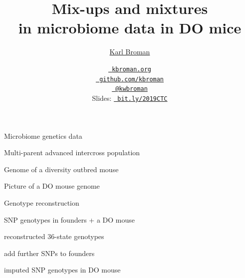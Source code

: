\documentclass[aspectratio=169,12pt,t]{beamer}
\title{Mix-ups and mixtures \\
  in microbiome data in DO mice}
\author{\href{https://kbroman.org}{Karl Broman}}
\institute{Biostatistics \& Medical Informatics \\ Univ.\ Wisconsin{\textendash}Madison}
\date{\href{https://kbroman.org}{\tt \scriptsize \color{foreground} kbroman.org}
\\[-4pt]
\href{https://github.com/kbroman}{\tt \scriptsize \color{foreground} github.com/kbroman}
\\[-4pt]
\href{https://twitter.com/kwbroman}{\tt \scriptsize \color{foreground} @kwbroman}
\\[2pt]
\scriptsize {\lolit Slides:} \href{https://bit.ly/2019CTC}{\tt \scriptsize
  \color{foreground} bit.ly/2019CTC}
}
\begin{document}
{
 }




\begin{frame}[c]{Microbiome genetics data}


\note{}

\end{frame}





\begin{frame}[c]{Multi-parent advanced intercross population}


\note{}

\end{frame}



\begin{frame}[c]{Genome of a diversity outbred mouse}

\bbi
\item Picture of a DO mouse genome
\ei

\note{}

\end{frame}


\begin{frame}[c]{Genotype reconstruction}

\bbi
 \item SNP genotypes in founders + a DO mouse
 \item reconstructed 36-state genotypes
 \item add further SNPs to founders
 \item imputed SNP genotypes in DO mouse
\ei

\note{}

\end{frame}
\end{document}
